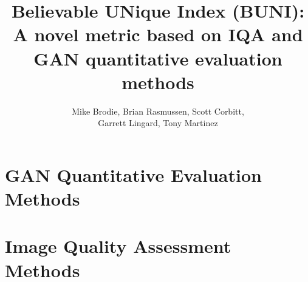 \documentclass[12pt]{article}
\title{Believable UNique Index (BUNI): \\A novel metric based on IQA and GAN quantitative evaluation methods}
\date{}
\author{Mike Brodie, Brian Rasmussen, Scott Corbitt, \\ Garrett Lingard, Tony Martinez}
\begin{document}
\maketitle

\section{GAN Quantitative Evaluation Methods}


%
%
%
%

\section{Image Quality Assessment Methods}




\end{document}
